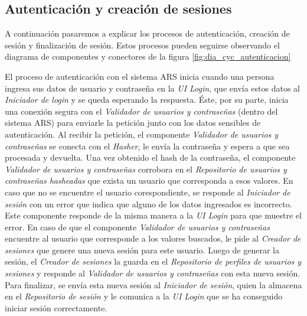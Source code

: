 \subsection{Autenticación y creación de sesiones}

\par A continuación pasaremos a explicar los procesos de autenticación, creación de sesión y finalización de sesión. Estos procesos pueden seguirse observando el diagrama de componentes y conectores de la figura \ref{fig:dia_cyc_autenticacion}

\par El proceso de autenticación con el sistema ARS inicia cuando una persona ingresa sus datos de usuario y contraseña en la \textit{UI Login}, que envía estos datos al \textit{Iniciador de login} y se queda esperando la respuesta. Éste, por su parte, inicia una conexión segura con el \textit{Validador de usuarios y contraseñas} (dentro del sistema ARS) para enviarle la petición junto con los datos sensibles de autenticación. Al recibir la petición, el componente \textit{Validador de usuarios y contraseñas} se conecta con el \textit{Hasher}, le envía la contraseña y espera a que sea procesada y devuelta. Una vez obtenido el hash de la contraseña, el componente \textit{Validador de usuarios y contraseñas} corrobora en el \textit{Repositorio de usuarios y contraseñas hasheadas} que exista un usuario que corresponda a esos valores. En caso que no se encuentre el usuario corespondiente, se responde al \textit{Iniciador de sesión} con un error que indica que alguno de los datos ingresados es incorrecto. Este componente responde de la misma manera a la \textit{UI Login} para que muestre el error. En caso de que el componente \textit{Validador de usuarios y contraseñas} encuentre al usuario que corresponde a los valores buscados, le pide al \textit{Creador de sesiones} que genere una nueva sesión para este usuario. Luego de generar la sesión, el \textit{Creador de sesiones} la guarda en el \textit{Repositorio de perfiles de usuarios y sesiones} y responde al \textit{Validador de usuarios y contraseñas} con esta nueva sesión. Para finalizar, se envía esta nueva sesión al \textit{Iniciador de sesión}, quien la almacena en el \textit{Repositorio de sesión} y le comunica a la \textit{UI Login} que se ha conseguido iniciar sesión correctamente.

